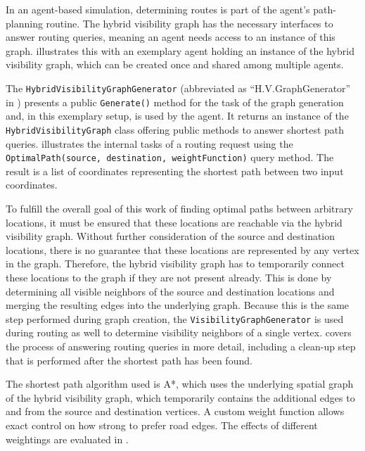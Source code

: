 	In an agent-based simulation, determining routes is part of the agent's path-planning routine.
	The hybrid visibility graph has the necessary interfaces to answer routing queries, meaning an agent needs access to an instance of this graph.
	 illustrates this with an exemplary agent holding an instance of the hybrid visibility graph, which can be created once and shared among multiple agents.
	
	The \texttt{HybridVisibilityGraphGenerator} (abbreviated as \enquote{H.V.GraphGenerator} in ) presents a public \texttt{Generate()} method for the task of the graph generation and, in this exemplary setup, is used by the agent.
	It returns an instance of the \texttt{HybridVisibilityGraph} class offering public methods to answer shortest path queries.
	 illustrates the internal tasks of a routing request using the \texttt{OptimalPath(source, destination, weightFunction)} query method.
	The result is a list of coordinates representing the shortest path between two input coordinates.
	
	To fulfill the overall goal of this work of finding optimal paths between arbitrary locations, it must be ensured that these locations are reachable via the hybrid visibility graph.
	Without further consideration of the source and destination locations, there is no guarantee that these locations are represented by any vertex in the graph.
	Therefore, the hybrid visibility graph has to temporarily connect these locations to the graph if they are not present already.
	This is done by determining all visible neighbors of the source and destination locations and merging the resulting edges into the underlying graph.
	Because this is the same step performed during graph creation, the \texttt{VisibilityGraphGenerator} is used during routing as well to determine visibility neighbors of a single vertex.
	 covers the process of answering routing queries in more detail, including a clean-up step that is performed after the shortest path has been found.
	
	The shortest path algorithm used is A*, which uses the underlying spatial graph of the hybrid visibility graph, which temporarily contains the additional edges to and from the source and destination vertices.
	A custom weight function allows exact control on how strong to prefer road edges.
	The effects of different weightings are evaluated in .

